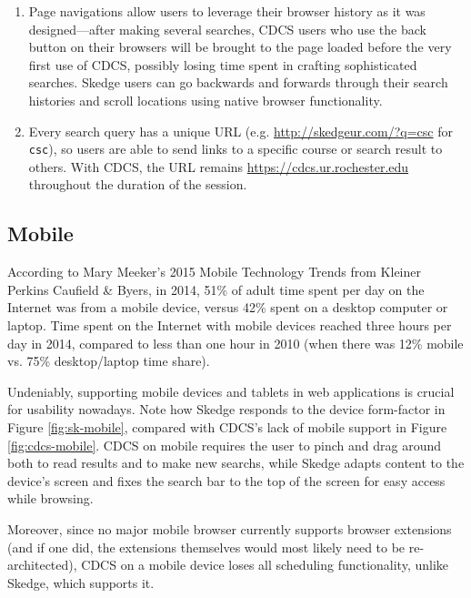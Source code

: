 \begin{enumerate}
  \item Page navigations allow users to leverage their browser history as it was designed---after making several searches, CDCS users who use the back button on their browsers will be brought to the page loaded before the very first use of CDCS, possibly losing time spent in crafting sophisticated searches. Skedge users can go backwards and forwards through their search histories and scroll locations using native browser functionality.
  \item Every search query has a unique URL (e.g. \url{http://skedgeur.com/?q=csc} for {\tt csc}), so users are able to send links to a specific course or search result to others. With CDCS, the URL remains \url{https://cdcs.ur.rochester.edu} throughout the duration of the session.
\end{enumerate}


\subsection{Mobile}

According to Mary Meeker's 2015 Mobile Technology Trends from Kleiner Perkins Caufield \& Byers\cite{kpcb}, in 2014, 51\% of adult time spent per day on the Internet was from a mobile device, versus 42\% spent on a desktop computer or laptop. Time spent on the Internet with mobile devices reached three hours per day in 2014, compared to less than one hour in 2010 (when there was 12\% mobile vs. 75\% desktop/laptop time share).

Undeniably, supporting mobile devices and tablets in web applications is crucial for usability nowadays. Note how Skedge responds to the device form-factor in Figure \ref{fig:sk-mobile}, compared with CDCS's lack of mobile support in Figure \ref{fig:cdcs-mobile}. CDCS on mobile requires the user to pinch and drag around both to read results and to make new searchs, while Skedge adapts content to the device's screen and fixes the search bar to the top of the screen for easy access while browsing.

Moreover, since no major mobile browser currently supports browser extensions (and if one did, the extensions themselves would most likely need to be re-architected), CDCS on a mobile device loses all scheduling functionality, unlike Skedge, which supports it.

